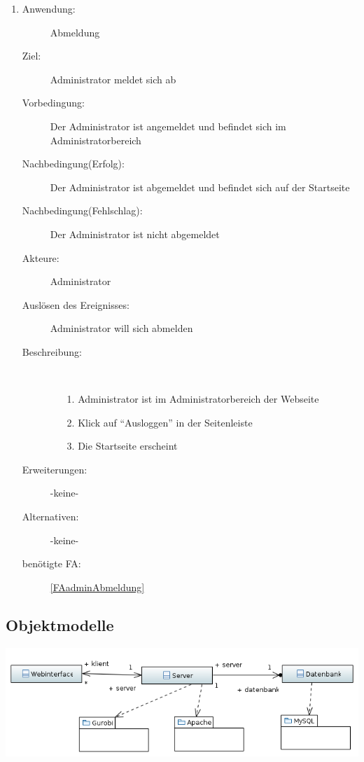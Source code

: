 \documentclass[parskip=full]{scrartcl}
\newcommand{\swtLabel}[1]{\textbf{/#1\arabic*0/}}
\begin{document}
\begin{enumerate} [label=\swtLabel{A}]
  \item \label{UCadminLogout}
    \begin{description}
  	\item[Anwendung:] Abmeldung
  	\item[Ziel:] Administrator meldet sich ab
  	\item[Vorbedingung:] Der Administrator ist angemeldet und befindet sich im Administratorbereich
  	\item[Nachbedingung(Erfolg):] Der Administrator ist abgemeldet und befindet sich auf der Startseite
  	\item[Nachbedingung(Fehlschlag):] Der Administrator ist nicht abgemeldet
  	\item[Akteure:] Administrator
  	\item[Auslösen des Ereignisses:] Administrator will sich abmelden
  	\item[Beschreibung:]~
  	\begin{enumerate}
  	  \item[1.] Administrator ist im Administratorbereich der Webseite
      \item[2.] Klick auf \enquote{Ausloggen} in der Seitenleiste
      \item[3.] Die Startseite erscheint
  	\end{enumerate}
  	\item[Erweiterungen:] -keine-
  	\item[Alternativen:] -keine-
  	\item[benötigte FA:] \ref{FAadminAbmeldung}
  \end{description}
  
\end{enumerate}  
\subsection{Objektmodelle}

\includegraphics[width=\linewidth]{diagramme_pflichtenheft/ClassDiagram.PNG}

\end{document}

